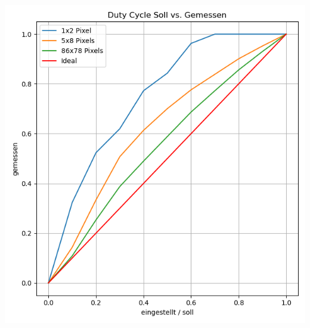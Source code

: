 \noindent\begin{minipage}[t]{.497\linewidth}\vspace{0pt}

    \includegraphics[width=\linewidth]{../images/pwm-test.png}
    \vspace{-2.5em}
    \label{img:PWM-Machbarkeitsanalyse}

\end{minipage}
